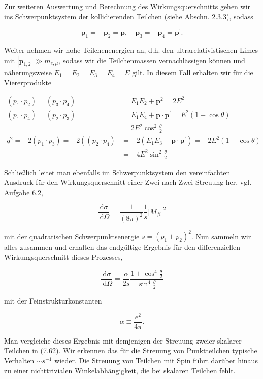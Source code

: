 \documentclass[10pt, letterpaper]{article}
\begin{document}
Zur weiteren Auswertung und Berechnung des Wirkungsquerschnitts gehen wir ins Schwerpunktsystem der kollidierenden Teilchen (siehe Abschn. 2.3.3), sodass

$$
\mathbf{p}_{1}=-\mathbf{p}_{2}=\mathbf{p}, \quad \mathbf{p}_{3}=-\mathbf{p}_{4}=\mathbf{p}^{\prime} .
$$

Weiter nehmen wir hohe Teilchenenergien an, d.h. den ultrarelativistischen Limes mit $\left|\mathbf{p}_{1,2}\right| \gg m_{e, \mu}$, sodass wir die Teilchenmassen vernachlässigen können und näherungsweise $E_{1}=E_{2}=E_{3}=E_{4}=E$ gilt. In diesem Fall erhalten wir für die Viererprodukte

$$
\begin{aligned}
\left(p_{1} \cdot p_{2}\right)=\left(p_{3} \cdot p_{4}\right) & =E_{1} E_{2}+\mathbf{p}^{2}=2 E^{2} \\
\left(p_{1} \cdot p_{4}\right)=\left(p_{2} \cdot p_{3}\right) & =E_{1} E_{4}+\mathbf{p} \cdot \mathbf{p}^{\prime}=E^{2}(1+\cos \theta) \\
& =2 E^{2} \cos ^{2} \frac{\theta}{2} \\
q^{2}=-2\left(p_{1} \cdot p_{3}\right)=-2\left(\left(p_{2} \cdot p_{4}\right)\right. & =-2\left(E_{1} E_{3}-\mathbf{p} \cdot \mathbf{p}^{\prime}\right)=-2 E^{2}(1-\cos \theta) \\
& =-4 E^{2} \sin ^{2} \frac{\theta}{2}
\end{aligned}
$$

Schließlich leitet man ebenfalls im Schwerpunktsystem den vereinfachten Ausdruck für den Wirkungsquerschnitt einer Zwei-nach-Zwei-Streuung her, vgl. Aufgabe 6.2,

$$
\frac{\mathrm{d} \sigma}{\mathrm{~d} \Omega}=\frac{1}{(8 \pi)^{2}} \frac{1}{s}\left|M_{f i}\right|^{2}
$$

mit der quadratischen Schwerpunktsenergie $s=\left(p_{1}+p_{2}\right)^{2}$. Nun sammeln wir alles zusammen und erhalten das endgültige Ergebnis für den differenziellen Wirkungsquerschnitt dieses Prozesses,

$$
\frac{\mathrm{d} \sigma}{\mathrm{~d} \Omega}=\frac{\alpha}{2 s} \frac{1+\cos ^{4} \frac{\theta}{2}}{\sin ^{4} \frac{\theta}{2}}
$$

mit der Feinstrukturkonstanten

$$
\alpha \equiv \frac{e^{2}}{4 \pi} .
$$

Man vergleiche dieses Ergebnis mit demjenigen der Streuung zweier skalarer Teilchen in (7.62). Wir erkennen das für die Streuung von Punktteilchen typische Verhalten $\sim s^{-1}$ wieder. Die Streuung von Teilchen mit Spin führt darüber hinaus zu einer nichttrivialen Winkelabhängigkeit, die bei skalaren Teilchen fehlt.
\end{document}
